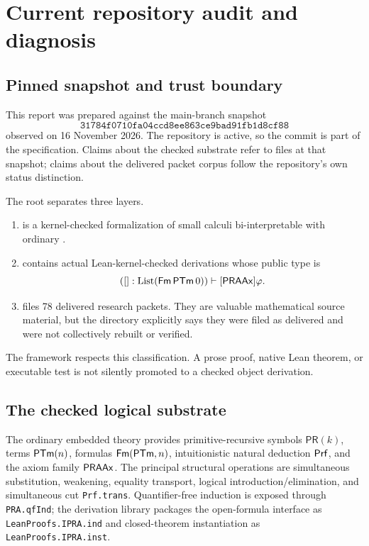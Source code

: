 \section{Current repository audit and diagnosis}\label{sec:audit}

\subsection{Pinned snapshot and trust boundary}

This report was prepared against the main-branch snapshot
\[
\texttt{31784f0710fa04ccd8ee863ce9bad91fb1d8cf88}
\]
observed on 16 November 2026.  The repository is active, so the commit is part of the specification.  Claims about the checked substrate refer to files at that snapshot; claims about the delivered packet corpus follow the repository's own status distinction.

The root  separates three layers.
\begin{enumerate}[label=(\arabic*)]
  \item {} is a kernel-checked formalization of small calculi bi-interpretable with ordinary \iPRA.
  \item {} contains actual Lean-kernel-checked derivations whose public type is
  \[
    ([]:\operatorname{List}(\mathsf{Fm}\,\mathsf{PTm}\,0))\vdash[\mathsf{PRAAx}]\varphi.
  \]
  \item {} files 78 delivered research packets.  They are valuable mathematical source material, but the directory explicitly says they were filed as delivered and were not collectively rebuilt or verified.
\end{enumerate}
The framework respects this classification.  A prose proof, native Lean theorem, or executable test is not silently promoted to a checked object derivation.

\subsection{The checked logical substrate}

The ordinary embedded theory provides primitive-recursive symbols \(\mathsf{PR}(k)\), terms \(\mathsf{PTm}(n)\), formulas \(\mathsf{Fm}(\mathsf{PTm},n)\), intuitionistic natural deduction \(\mathsf{Prf}\), and the axiom family \(\mathsf{PRAAx}\).  The principal structural operations are simultaneous substitution, weakening, equality transport, logical introduction/elimination, and simultaneous cut \texttt{Prf.trans}.  Quantifier-free induction is exposed through \texttt{PRA.qfInd}; the derivation library packages the open-formula interface as \texttt{LeanProofs.IPRA.ind} and closed-theorem instantiation as \texttt{LeanProofs.IPRA.inst}.

